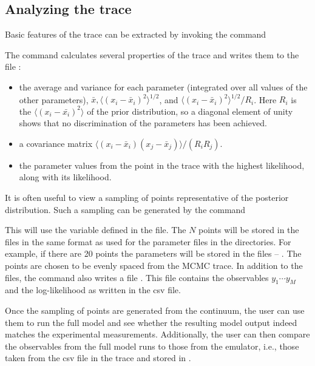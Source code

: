 \subsection{Analyzing the trace}

Basic features of the trace can be extracted by invoking the command


The command calculates several properties of the trace and writes them to the file :
\begin{itemize}\itemsep=0pt
\item the average and variance for each parameter (integrated over all values of the other parameters), $\bar{x},\langle(x_i-\bar{x}_i)^2\rangle^{1/2}$, and $\langle(x_i-\bar{x}_i)^2\rangle^{1/2}/R_i$.
Here $R_i$ is the $\langle (x_i-\bar{x_i})^2\rangle$ of the prior distribution, so a diagonal element of unity shows that no discrimination of the parameters has been achieved.
\item a covariance matrix $\langle (x_i-\bar{x}_i)(x_j-\bar{x}_j)\rangle/(R_iR_j)$.
\item the parameter values from the point in the trace with the highest likelihood, along with its likelihood.
\end{itemize}

It is often useful to view a sampling of points representative of the posterior distribution. Such a sampling can be generated by the command


This will use the variable  defined in the  file. The $N$ points will be stored in the files in the same format as used for the parameter files in the  directories. For example, if there are 20 points the parameters will be stored in the files -- . The points are chosen to be evenly spaced from the MCMC trace. In addition to the  files, the command also writes a file . This file contains the observables $y_1\cdots y_M$ and the log-likelihood as written in the csv file.

Once the sampling of points are generated from the continuum, the user can use them to run the full model and see whether the resulting model output indeed matches the experimental measurements. Additionally, the user can then compare the observables from the full model runs to those from the emulator, i.e., those taken from the csv file in the trace and stored in .

